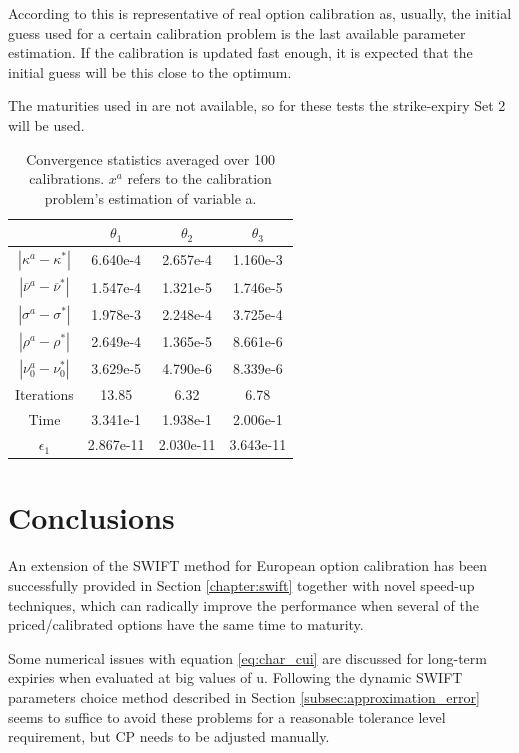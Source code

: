\documentclass[12,twoside]{mammeTFM}
\theoremstyle{definition}
\theoremstyle{remark}
\begin{document}
According to \cite{cui17} this is representative of real option calibration as, usually, the initial guess used for a certain calibration problem is the last available parameter estimation. If the calibration is updated fast enough, it is expected that the initial guess will be this close to the optimum.

The maturities used in \cite{cui17} are not available, so for these tests the strike-expiry Set 2 will be used.

\begin{table}[!h]
\begin{center}
 \begin{tabular}{|c | c | c | c|} 
 \hline
  & $\theta_1$ & $\theta_2$ & $\theta_3$\\ [0.5ex] 
 \hline
 $|\kappa^{a} - \kappa^{*}|$ & 6.640e-4 & 2.657e-4 & 1.160e-3 \\ 
 \hline
 $|\overline{\nu}^{a} - \overline{\nu}^{*}|$ & 1.547e-4 & 1.321e-5 & 1.746e-5\\
 \hline
 $|\sigma^{a} - \sigma^{*}|$ & 1.978e-3 & 2.248e-4 & 3.725e-4 \\
 \hline
 $|\rho^{a} - \rho^{*}|$ & 2.649e-4 & 1.365e-5 & 8.661e-6  \\
 \hline
 $|\nu_0^{a} - \nu_0^{*}|$ & 3.629e-5 & 4.790e-6 & 8.339e-6  \\
 \hline
 Iterations & 13.85 & 6.32 & 6.78 \\
 \hline
 Time & 3.341e-1 & 1.938e-1 & 2.006e-1 \\
 \hline
 $\epsilon_1$ & 2.867e-11 & 2.030e-11 & 3.643e-11\\
 \hline
\end{tabular}
\caption{Convergence statistics averaged over 100 calibrations. $x^a$ refers to the calibration problem's estimation of variable a.}\label{table:realistic}
\end{center}
\end{table}

\section{Conclusions}

An extension of the SWIFT method for European option calibration has been successfully provided in Section \ref{chapter:swift} together with novel speed-up techniques, which can radically improve the performance when several of the priced/calibrated options have the same time to maturity.

Some numerical issues with equation \ref{eq:char_cui} are discussed for long-term expiries when evaluated at big values of u. Following the dynamic SWIFT parameters choice method described in Section \ref{subsec:approximation_error} seems to suffice to avoid these problems for a reasonable tolerance level requirement, but CP needs to be adjusted manually.
\end{document}
